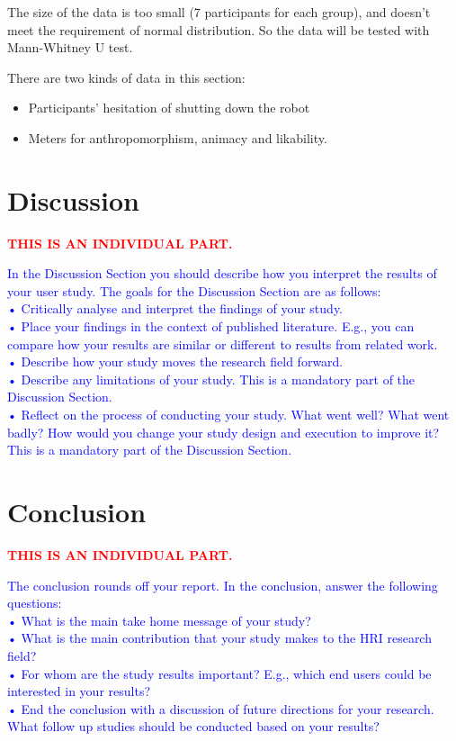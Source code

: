 \documentclass[conference]{IEEEtran}
\begin{document}

The size of the data is too small (7 participants for each group), and doesn't meet the requirement of normal distribution. So the data will be tested with Mann-Whitney U test.

There are two kinds of data in this section: 
\begin{itemize}
    \item Participants' hesitation of shutting down the robot
    \item Meters for anthropomorphism, animacy and likability.
\end{itemize}



\section{Discussion}



\textcolor{red}{\textbf{THIS IS AN INDIVIDUAL PART.}}

\textcolor{blue}{
In the Discussion Section you should describe how you interpret the results of your user study. 
The goals for the Discussion Section are as follows:\\
• Critically analyse and interpret the findings of your study.\\
• Place your findings in the context of published literature. E.g., you can compare how 
your results are similar or different to results from related work.\\
• Describe how your study moves the research field forward.\\
• Describe any limitations of your study. This is a mandatory part of the Discussion 
Section.\\
• Reflect on the process of conducting your study. What went well? What went badly? 
How would you change your study design and execution to improve it? This is a 
mandatory part of the Discussion Section.
}

\section{Conclusion}

\textcolor{red}{\textbf{THIS IS AN INDIVIDUAL PART.}}

\textcolor{blue}{The conclusion rounds off your report. In the conclusion, answer the following questions:\\
• What is the main take home message of your study?\\
• What is the main contribution that your study makes to the HRI research field?\\
• For whom are the study results important? E.g., which end users could be interested 
in your results?\\
• End the conclusion with a discussion of future directions for your research. What follow 
up studies should be conducted based on your results?}
\end{document}
